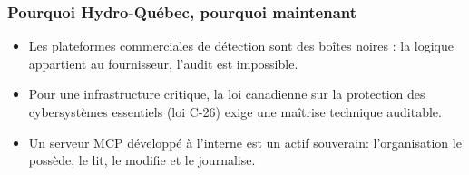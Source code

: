 \documentclass[aspectratio=169,11pt]{beamer}
\begin{document}
\begin{frame}
  \frametitle{Pourquoi Hydro-Québec, pourquoi maintenant}
  \vspace{0.15cm}
  \begin{itemize}\setlength\itemsep{0.5em}
    \item Les plateformes commerciales de détection sont des boîtes
      noires : la logique appartient au fournisseur, l'audit est impossible.
    \item Pour une infrastructure critique, la loi canadienne sur la protection des cybersystèmes essentiels (loi C-26) exige une maîtrise technique auditable.
    \item Un serveur MCP développé à l'interne est un actif souverain:
      l'organisation le possède, le lit, le modifie et le journalise.
  \end{itemize}
  \vspace{0.35cm}
\end{frame}
\end{document}
